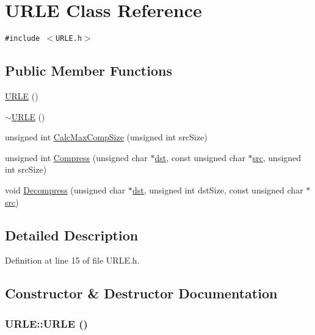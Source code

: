 \hypertarget{class_u_r_l_e}{
\section{URLE Class Reference}
\label{class_u_r_l_e}
}
{\tt \#include $<$URLE.h$>$}

\subsection*{Public Member Functions}
\begin{CompactItemize}
\item 
\hyperlink{class_u_r_l_e_ce5d72e46ecf93948aa447a1d3127b2d}{URLE} ()
\item 
\hyperlink{class_u_r_l_e_a85af2a1c357f24303402ec09aac3ae2}{$\sim$URLE} ()
\item 
unsigned int \hyperlink{class_u_r_l_e_517415db71b4453c352c58ad288cc224}{CalcMaxCompSize} (unsigned int srcSize)
\item 
unsigned int \hyperlink{class_u_r_l_e_d41520530d62de1703824d56bb214116}{Compress} (unsigned char $\ast$\hyperlink{glext__bak_8h_92034251bfd455d524a9b5610cddba00}{dst}, const unsigned char $\ast$\hyperlink{glext__bak_8h_72e0fdf0f845ded60b1fada9e9195cd7}{src}, unsigned int srcSize)
\item 
void \hyperlink{class_u_r_l_e_4be2c4f71c9902b4b9dd8292e74bb58f}{Decompress} (unsigned char $\ast$\hyperlink{glext__bak_8h_92034251bfd455d524a9b5610cddba00}{dst}, unsigned int dstSize, const unsigned char $\ast$\hyperlink{glext__bak_8h_72e0fdf0f845ded60b1fada9e9195cd7}{src})
\end{CompactItemize}


\subsection{Detailed Description}


Definition at line 15 of file URLE.h.

\subsection{Constructor \& Destructor Documentation}
\hypertarget{class_u_r_l_e_ce5d72e46ecf93948aa447a1d3127b2d}{
\subsubsection[{URLE}]{\setlength{\rightskip}{0pt plus 5cm}URLE::URLE ()}}
\label{class_u_r_l_e_ce5d72e46ecf93948aa447a1d3127b2d}




